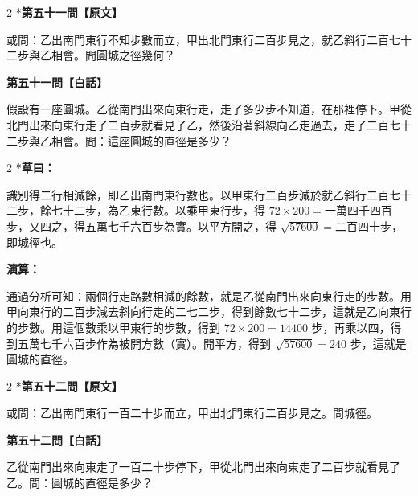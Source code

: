 \documentclass[11pt,a4paper]{article}
\begin{document}
\vspace{0.3cm}

\begin{paracol}{2}
\switchcolumn[0]*\noindent\textbf{第五十一問【原文】}

\small 或問：乙出南門東行不知步數而立，甲出北門東行二百步見之，就乙斜行二百七十二步與乙相會。問圓城之徑幾何？

\switchcolumn\noindent\textbf{第五十一問【白話】}

\small 假設有一座圓城。乙從南門出來向東行走，走了多少步不知道，在那裡停下。甲從北門出來向東行走了二百步就看見了乙，然後沿著斜線向乙走過去，走了二百七十二步與乙相會。問：這座圓城的直徑是多少？
\end{paracol}

\vspace{0.1cm}
\noindent{}
\par\vspace{0.15cm}

\begin{paracol}{2}
\switchcolumn[0]*\textbf{草曰：}

\small 識別得二行相減餘，即乙出南門東行數也。以甲東行二百步減於就乙斜行二百七十二步，餘七十二步，為乙東行數。以乘甲東行步，得 $72 \times 200 ={}$一萬四千四百步，又四之，得五萬七千六百步為實。以平方開之，得 $\sqrt{57600} ={}$二百四十步，即城徑也。

\switchcolumn\textbf{演算：}

\small 通過分析可知：兩個行走路數相減的餘數，就是乙從南門出來向東行走的步數。用甲向東行的二百步減去斜向行走的二七二步，得到餘數七十二步，這就是乙向東行的步數。用這個數乘以甲東行的步數，得到 $72 \times 200 = 14400$ 步，再乘以四，得到五萬七千六百步作為被開方數（實）。開平方，得到 $\sqrt{57600} = 240$ 步，這就是圓城的直徑。
\end{paracol}

\vspace{0.1cm}
\noindent{}
\par\vspace{0.3cm}

\begin{paracol}{2}
\switchcolumn[0]*\noindent\textbf{第五十二問【原文】}

\small 或問：乙出南門東行一百二十步而立，甲出北門東行二百步見之。問城徑。

\switchcolumn\noindent\textbf{第五十二問【白話】}

\small 乙從南門出來向東走了一百二十步停下，甲從北門出來向東走了二百步就看見了乙。問：圓城的直徑是多少？
\end{paracol}
\end{document}
